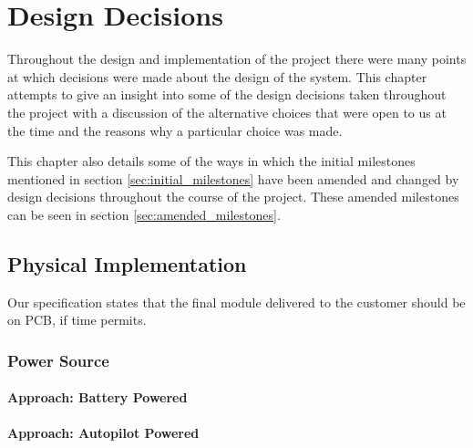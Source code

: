 \chapter{Design Decisions}
Throughout the design and implementation of the project there were many points
at which decisions were made about the design of the system. This chapter attempts
to give an insight into some of the design decisions taken throughout the project with
a discussion of the alternative choices that were open to us at the time and the reasons
why a particular choice was made.

This chapter also details some of the ways in which the initial milestones mentioned in section
\ref{sec:initial_milestones} have been amended and changed by design decisions throughout
the course of the project. These amended milestones can be seen in section \ref{sec:amended_milestones}.












\section{Physical Implementation}

Our specification states that the final module delivered to the customer 
should be on PCB, if time permits. 
	
\subsection{Power Source}

\subsubsection{Approach: Battery Powered}

\subsubsection{Approach: Autopilot Powered}


